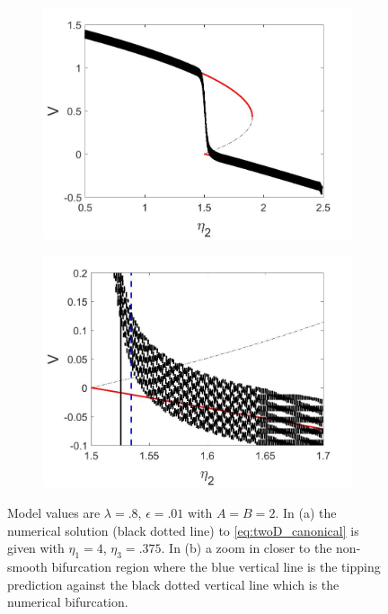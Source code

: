 \begin{figure}[H]
\centering
\begin{subfigure}{.5\textwidth}
  \centering
  \includegraphics[width=\linewidth]{twoD/slowosc_bif_diagram_small.jpg}
  \caption{}
\end{subfigure}%
\begin{subfigure}{.5\textwidth}
  \centering
  \includegraphics[width=\linewidth]{twoD/slowosc_bif_diagram_small_zoom.jpg}
  \caption{}
\end{subfigure}
\caption{Model values are $\lambda=.8$, $\epsilon=.01$ with $A=B=2$. In (a) the numerical solution (black dotted line) to \eqref{eq:twoD_canonical} is given with $\eta_1=4$, $\eta_3=.375$. In (b) a zoom in closer to the non-smooth bifurcation region where the blue vertical line is the tipping prediction against the black dotted vertical line which is the numerical bifurcation.}
\label{fig:twoD_slowosc_Vnumerics_small}
\end{figure}


